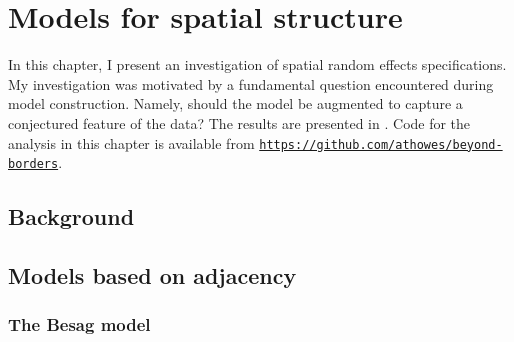 \documentclass[a4paper, nobind]{templates/ociamthesis}
\begin{document}
\hypertarget{beyond-borders}{%
\chapter{Models for spatial structure}\label{beyond-borders}}

\adjustmtc
{}

In this chapter, I present an investigation of spatial random effects specifications.
My investigation was motivated by a fundamental question encountered during model construction.
Namely, should the model be augmented to capture a conjectured feature of the data?
The results are presented in \textcite{howes2023beyond}.
Code for the analysis in this chapter is available from \href{https://github.com/athowes/beyond-borders}{\texttt{https://github.com/athowes/beyond-borders}}.

\hypertarget{background-1}{%
\section{Background}\label{background-1}}

\hypertarget{models-based-on-adjacency}{%
\section{Models based on adjacency}\label{models-based-on-adjacency}}

\hypertarget{the-besag-model}{%
\subsection{The Besag model}\label{the-besag-model}}
\end{document}
